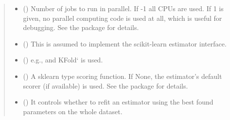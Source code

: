 \documentclass[letterpaper,10pt,english]{sphinxmanual}
\begin{document}
\begin{fulllineitems}
\begin{quote}
\begin{description}
\begin{itemize}
\item {} 
 (\sphinxstyleliteralemphasis{\sphinxupquote{, }}\sphinxstyleliteralemphasis{\sphinxupquote{, }}\sphinxstyleliteralemphasis{\sphinxupquote{, }}) \textendash{} Number of jobs to run in parallel.
If -1 all CPUs are used. If 1 is given, no parallel computing code
is used at all, which is useful for debugging. See the package  for details.

\item {} 
 () \textendash{} This is assumed to implement the scikit-learn estimator interface.

\item {} 
 (\sphinxstyleliteralemphasis{\sphinxupquote{, }}) \textendash{} e.g.,  and KFold{}` is used.

\item {} 
 (\sphinxstyleliteralemphasis{\sphinxupquote{, }}\sphinxstyleliteralemphasis{\sphinxupquote{, }}\sphinxstyleliteralemphasis{\sphinxupquote{, }}\sphinxstyleliteralemphasis{\sphinxupquote{, }}\sphinxstyleliteralemphasis{\sphinxupquote{, }}) \textendash{} A sklearn type scoring function. 
If None, the estimator’s default scorer (if available) is used. See the package  for details.

\item {} 
 (\sphinxstyleliteralemphasis{\sphinxupquote{, }}\sphinxstyleliteralemphasis{\sphinxupquote{, }}) \textendash{} It controls whether to refit an estimator using the best found parameters on the whole dataset.


\end{itemize}
\end{description}
\end{quote}
\end{fulllineitems}
\end{document}

